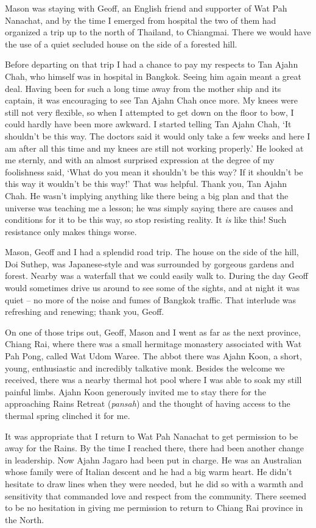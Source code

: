 Mason was staying with Geoff, an English friend and supporter of Wat Pah
Nanachat, and by the time I emerged from hospital the two of them had
organized a trip up to the north of Thailand, to Chiangmai. There we
would have the use of a quiet secluded house on the side of a forested
hill.

Before departing on that trip I had a chance to pay my respects to Tan
Ajahn Chah, who himself was in hospital in Bangkok. Seeing him again
meant a great deal. Having been for such a long time away from the
mother ship and its captain, it was encouraging to see Tan Ajahn Chah
once more. My knees were still not very flexible, so when I attempted to
get down on the floor to bow, I could hardly have been more awkward. I
started telling Tan Ajahn Chah, `It shouldn't be this way. The doctors
said it would only take a few weeks and here I am after all this time
and my knees are still not working properly.' He looked at me sternly,
and with an almost surprised expression at the degree of my foolishness
said, `What do you mean it shouldn't be this way? If it shouldn't be
this way it wouldn't be this way!' That was helpful. Thank you, Tan
Ajahn Chah. He wasn't implying anything like there being a big plan and
that the universe was teaching me a lesson; he was simply saying there
are causes and conditions for it to be this way, so stop resisting
reality. It \emph{is} like this! Such resistance only makes things
worse.

Mason, Geoff and I had a splendid road trip. The house on the side of
the hill, Doi Suthep, was Japanese-style and was surrounded by gorgeous
gardens and forest. Nearby was a waterfall that we could easily walk to.
During the day Geoff would sometimes drive us around to see some of the
sights, and at night it was quiet -- no more of the noise and fumes of
Bangkok traffic. That interlude was refreshing and renewing; thank you,
Geoff.

On one of those trips out, Geoff, Mason and I went as far as the next
province, Chiang Rai, where there was a small hermitage monastery
associated with Wat Pah Pong, called Wat Udom Waree. The abbot
there was Ajahn Koon, a short, young, enthusiastic and incredibly
talkative monk. Besides the welcome we received, there was a nearby
thermal hot pool where I was able to soak my still painful limbs. Ajahn
Koon generously invited me to stay there for the approaching Rains
Retreat (\emph{pansah}) and the thought of having access to the thermal
spring clinched it for me.

It was appropriate that I return to Wat Pah Nanachat to get permission
to be away for the Rains. By the time I reached there, there had been
another change in leadership. Now Ajahn Jagaro had been put in charge.
He was an Australian whose family were of Italian descent and he had a
big warm heart. He didn't hesitate to draw lines when they were needed,
but he did so with a warmth and sensitivity that commanded love and
respect from the community. There seemed to be no hesitation in giving
me permission to return to Chiang Rai province in the North.

